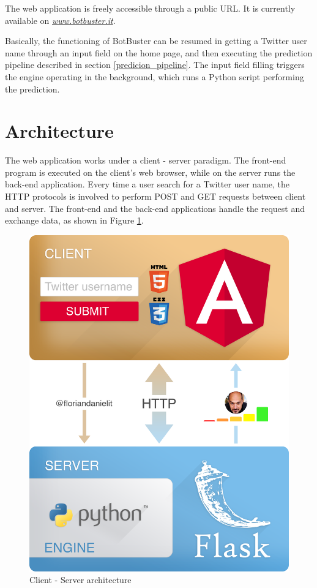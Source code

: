The web application is freely accessible through a public URL. It is currently available on \href{http://www.botbuster.it}{\textit{www.botbuster.it}}.

Basically, the functioning of BotBuster can be resumed in getting a Twitter user name through an input field on the home page, and then executing the prediction pipeline described in section \ref{predicion_pipeline}.
The input field filling triggers the engine operating in the background, which runs a Python script performing the prediction.
\section{Architecture}
The web application works under a client - server paradigm. The front-end program is executed on the client's web browser, while on the server runs the back-end application.
Every time a user search for a Twitter user name, the HTTP protocols is involved to perform POST and GET requests between client and server. The front-end and the back-end applications handle the request and exchange data, as shown in Figure \ref{fig:architecture}.
\begin{figure}[t!]
	\begin{center}
		\includegraphics[width=0.6\columnwidth]{chapter7/figure/architecture.png} 
	\end{center}
	\caption{Client - Server architecture}
	\label{fig:architecture}
\end{figure}

